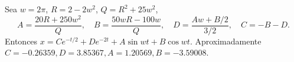 Sea \(w=2\pi\), \(R=2-2w^2\), \(Q=R^2+25w^2\),
\[A=\frac{20R+250w^2}{Q},\quad B=\frac{50wR-100w}{Q},\quad D=\frac{Aw+B/2}{3/2},\quad C=-B-D.\]
Entonces \(x=Ce^{-t/2}+De^{-2t}+A\sin wt+B\cos wt\). Aproximadamente \(C=-0.26359,D=3.85367,A=1.20569,B=-3.59008\).
